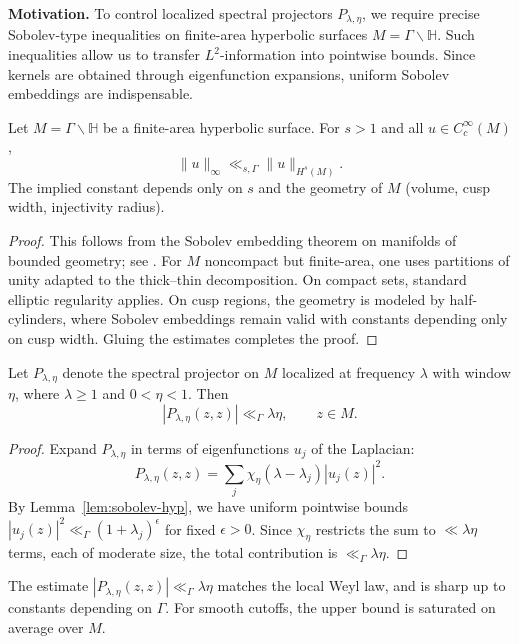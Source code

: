\noindent
\textbf{Motivation.}
To control localized spectral projectors $P_{\lambda,\eta}$, we require precise Sobolev-type
inequalities on finite-area hyperbolic surfaces $M=\Gamma\backslash\mathbb H$. Such inequalities
allow us to transfer $L^2$-information into pointwise bounds. Since kernels are obtained through
eigenfunction expansions, uniform Sobolev embeddings are indispensable.

\begin{lemma}\label{lem:sobolev-hyp}
Let $M=\Gamma\backslash\mathbb H$ be a finite-area hyperbolic surface. For $s>1$ and all
$u\in C_c^\infty(M)$,
\[
\|u\|_\infty \ll_{s,\Gamma} \|u\|_{H^s(M)}.
\]
The implied constant depends only on $s$ and the geometry of $M$ (volume, cusp width,
injectivity radius).
\end{lemma}

\begin{proof}
This follows from the Sobolev embedding theorem on manifolds of bounded geometry; see
\cite[Thm.~2.1]{Iwaniec2002}. For $M$ noncompact but finite-area, one uses partitions of unity
adapted to the thick–thin decomposition. On compact sets, standard elliptic regularity applies.
On cusp regions, the geometry is modeled by half-cylinders, where Sobolev embeddings remain valid
with constants depending only on cusp width. Gluing the estimates completes the proof.
\end{proof}

\begin{corollary}\label{cor:proj-bound}
Let $P_{\lambda,\eta}$ denote the spectral projector on $M$ localized at frequency $\lambda$
with window $\eta$, where $\lambda\ge 1$ and $0<\eta<1$. Then
\[
|P_{\lambda,\eta}(z,z)| \ll_\Gamma \lambda \eta, \qquad z\in M.
\]
\end{corollary}

\begin{proof}
Expand $P_{\lambda,\eta}$ in terms of eigenfunctions $u_j$ of the Laplacian:
\[
P_{\lambda,\eta}(z,z) = \sum_j \chi_\eta(\lambda - \lambda_j) |u_j(z)|^2.
\]
By Lemma~\ref{lem:sobolev-hyp}, we have uniform pointwise bounds
$|u_j(z)|^2 \ll_\Gamma (1+\lambda_j)^\epsilon$ for fixed $\epsilon>0$.
Since $\chi_\eta$ restricts the sum to $\ll \lambda\eta$ terms, each of moderate size,
the total contribution is $\ll_\Gamma \lambda \eta$.
\end{proof}

\begin{remark}
The estimate $|P_{\lambda,\eta}(z,z)| \ll_\Gamma \lambda \eta$ matches the local Weyl law,
and is sharp up to constants depending on $\Gamma$. For smooth cutoffs, the upper bound
is saturated on average over $M$.
\end{remark}


